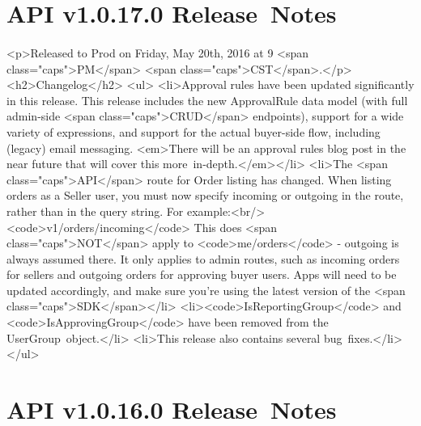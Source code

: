 \documentclass{memoir}%
\begin{document}
%
\section*{API v1.0.17.0 Release~Notes}%
\paragraph*{}%

%
\paragraph*{}%
<p>Released to Prod on Friday, May 20th, 2016 at 9 <span class="caps">PM</span> <span class="caps">CST</span>.</p>\newline%
<h2>Changelog</h2>\newline%
<ul>\newline%
<li>Approval rules have been updated significantly in this release. This release includes the new ApprovalRule data model (with full admin{-}side <span class="caps">CRUD</span> endpoints), support for a wide variety of expressions, and support for the actual buyer{-}side flow, including (legacy) email messaging. <em>There will be an approval rules blog post in the near future that will cover this more~in{-}depth.</em></li>\newline%
<li>The <span class="caps">API</span> route for Order listing has changed. When listing orders as a Seller user, you must now specify incoming or outgoing in the route, rather than in the query string. For example:<br/>\newline%
<code>v1/orders/incoming</code> \newline%
      This does <span class="caps">NOT</span> apply to <code>me/orders</code> {-} outgoing is always assumed there. It only applies to admin routes, such as incoming orders for sellers and outgoing orders for approving buyer users. Apps will need to be updated accordingly, and make sure you’re using the latest version of the <span class="caps">SDK</span></li>\newline%
<li><code>IsReportingGroup</code> and <code>IsApprovingGroup</code> have been removed from the UserGroup~object.</li>\newline%
<li>This release also contains several bug~fixes.</li>\newline%
</ul>

%
\section*{API v1.0.16.0 Release~Notes}%
\end{document}
